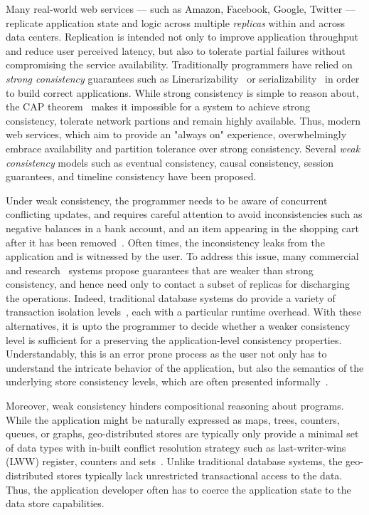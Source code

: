 \documentclass[pldi]{sigplanconf}
\begin{document}
Many real-world web services --- such as Amazon, Facebook, Google, Twitter ---
replicate application state and logic across multiple \emph{replicas} within
and across data centers. Replication is intended not only to improve
application throughput and reduce user perceived latency, but also to tolerate
partial failures without compromising the service availability. Traditionally
programmers have relied on \emph{strong consistency} guarantees such as
Linerarizability~\cite{Herlihy1990} or serializability~\cite{Serializability}
in order to build correct applications. While strong consistency is simple to
reason about, the CAP theorem~\cite{Brewer2000,Gilbert} makes it impossible for
a system to achieve strong consistency, tolerate network partions and remain
highly available. Thus, modern web services, which aim to provide an "always
on" experience, overwhelmingly embrace availability and partition tolerance
over strong consistency. Several \emph{weak consistency} models such as
eventual consistency, causal consistency, session guarantees, and timeline
consistency have been proposed.

Under weak consistency, the programmer needs to be aware of concurrent
conflicting updates, and requires careful attention to avoid inconsistencies
such as negative balances in a bank account, and an item appearing in the
shopping cart after it has been removed~\cite{Dynamo}. Often times, the
inconsistency leaks from the application and is witnessed by the user. To
address this issue, many commercial~\cite{} and research~\cite{} systems
propose guarantees that are weaker than strong consistency, and hence need only
to contact a subset of replicas for discharging the operations. Indeed,
traditional database systems do provide a variety of transaction isolation
levels~\cite{}, each with a particular runtime overhead. With these
alternatives, it is upto the programmer to decide whether a weaker consistency
level is sufficient for a preserving the application-level consistency
properties. Understandably, this is an error prone process as the user not only
has to understand the intricate behavior of the application, but also the
semantics of the underlying store consistency levels, which are often presented
informally~\cite{}.

Moreover, weak consistency hinders compositional reasoning about programs.
While the application might be naturally expressed as maps, trees, counters,
queues, or graphs, geo-distributed stores are typically only provide a minimal
set of data types with in-built conflict resolution strategy such as
last-writer-wins (LWW) register, counters and sets~\cite{Cassandra,DynamoDB}.
Unlike traditional database systems, the geo-distributed stores typically lack
unrestricted transactional access to the data. Thus, the application developer
often has to coerce the application state to the data store capabilities.
\end{document}
